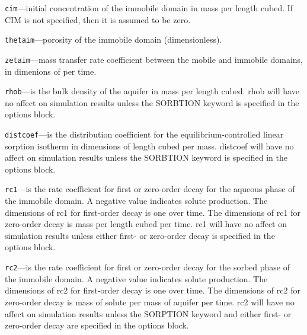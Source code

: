 \begin{description}
\item \texttt{cim}---initial concentration of the immobile domain in mass per length cubed.  If CIM is not specified, then it is assumed to be zero.

\item \texttt{thetaim}---porosity of the immobile domain (dimensionless).

\item \texttt{zetaim}---mass transfer rate coefficient between the mobile and immobile domains, in dimenions of per time.

\item \texttt{rhob}---is the bulk density of the aquifer in mass per length cubed.  rhob will have no affect on simulation results unless the SORBTION keyword is specified in the options block.

\item \texttt{distcoef}---is the distribution coefficient for the equilibrium-controlled linear sorption isotherm in dimensions of length cubed per mass.  distcoef will have no affect on simulation results unless the SORBTION keyword is specified in the options block.

\item \texttt{rc1}---is the rate coefficient for first or zero-order decay for the aqueous phase of the immobile domain.  A negative value indicates solute production.  The dimensions of rc1 for first-order decay is one over time.  The dimensions of rc1 for zero-order decay is mass per length cubed per time.  rc1 will have no affect on simulation results unless either first- or zero-order decay is specified in the options block.

\item \texttt{rc2}---is the rate coefficient for first or zero-order decay for the sorbed phase of the immobile domain.  A negative value indicates solute production.  The dimensions of rc2 for first-order decay is one over time.  The dimensions of rc2 for zero-order decay is mass of solute per mass of aquifer per time.  rc2 will have no affect on simulation results unless the SORPTION keyword and either first- or zero-order decay are specified in the options block.

\end{description}

